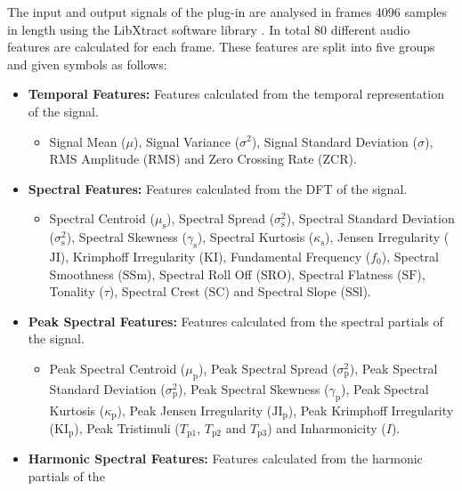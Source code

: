 		The input and output signals of the plug-in are analysed in frames 4096 samples in length using the
		LibXtract software library \citep{bullock2007libxtract}. In total 80 different audio features are
		calculated for each frame. These features are split into five groups and given symbols as follows:

		\begin{itemize}
			\item {\bf{Temporal Features:}} Features calculated from the temporal representation of the signal.
			\begin{itemize}
				\item Signal Mean ($\mu$), Signal Variance ($\sigma^{2}$), Signal Standard Deviation
				      ($\sigma$), RMS Amplitude ($\mathrm{RMS}$) and Zero Crossing Rate ($\mathrm{ZCR}$).
			\end{itemize}
			\item {\bf{Spectral Features:}} Features calculated from the DFT of the signal.
			\begin{itemize}
				\item Spectral Centroid ($\mu_{\mathrm{s}}$), Spectral Spread ($\sigma_{\mathrm{s}}^{2}$),
				      Spectral Standard Deviation ($\sigma_{\mathrm{s}}^{2}$), Spectral Skewness
				      ($\gamma_{\mathrm{s}}$), Spectral Kurtosis ($\kappa_{\mathrm{s}}$), Jensen
				      Irregularity ($\mathrm{JI}$), Krimphoff Irregularity ($\mathrm{KI}$), Fundamental
				      Frequency ($f_{0}$), Spectral Smoothness ($\mathrm{SSm}$), Spectral Roll Off
				      ($\mathrm{SRO}$), Spectral Flatness ($\mathrm{SF}$), Tonality ($\tau$), Spectral
				      Crest ($\mathrm{SC}$) and Spectral Slope ($\mathrm{SSl}$).
			\end{itemize}
			\item {\bf{Peak Spectral Features:}} Features calculated from the spectral partials of the signal.
			\begin{itemize}
				\item Peak Spectral Centroid ($\mu_{\mathrm{p}}$), Peak Spectral Spread
				      ($\sigma_{\mathrm{p}}^{2}$), Peak Spectral Standard Deviation
				      ($\sigma_{\mathrm{p}}^{2}$), Peak Spectral Skewness ($\gamma_{\mathrm{p}}$), Peak
				      Spectral Kurtosis ($\kappa_{\mathrm{p}}$), Peak Jensen Irregularity
				      ($\mathrm{JI_{p}}$), Peak Krimphoff Irregularity
				      ($\mathrm{KI_{p}}$), Peak Tristimuli ($T_{\mathrm{p}1}$, $T_{\mathrm{p}2}$
				      and $T_{\mathrm{p}3}$) and Inharmonicity ($I$).
			\end{itemize}
			\item {\bf{Harmonic Spectral Features:}} Features calculated from the harmonic partials of the

\end{itemize}
